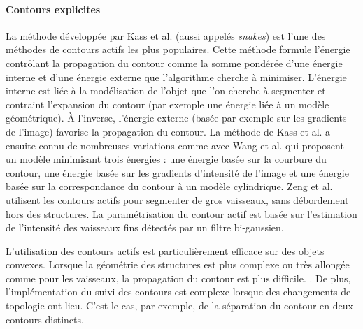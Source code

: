       \paragraph{Contours explicites}
      La méthode développée par Kass et al. \cite{Kass1988_snakes} (aussi appelés \textit{snakes}) est l'une des méthodes de contours actifs les plus populaires. Cette méthode formule l'énergie contrôlant la propagation du contour comme la somme pondérée d'une énergie interne et d'une énergie externe que l'algorithme cherche à minimiser. L'énergie interne est liée à la modélisation de l'objet que l'on cherche à segmenter et contraint l'expansion du contour (par exemple une énergie liée à un modèle géométrique). À l'inverse, l'énergie externe (basée par exemple sur les gradients de l'image) favorise la propagation du contour. La méthode de Kass et al. a ensuite connu de nombreuses variations comme avec Wang et al. \cite{Wang2012_vessel_level_set} qui proposent un modèle minimisant trois énergies : une énergie basée sur la courbure du contour, une énergie basée sur les gradients d'intensité de l'image et une énergie basée sur la correspondance du contour à un modèle cylindrique. Zeng et al. \cite{Zeng2018_liver_hybrid_active_contour_region_growing} utilisent les contours actifs pour segmenter de gros vaisseaux, sans débordement hors des structures. La paramétrisation du contour actif est basée sur l'estimation de l'intensité des vaisseaux fins détectés par un filtre bi-gaussien.

      L'utilisation des contours actifs est particulièrement efficace sur des objets convexes. Lorsque la géométrie des structures est plus complexe ou très allongée comme pour les vaisseaux, la propagation du contour est plus difficile. . De plus, l'implémentation du suivi des contours est complexe lorsque des changements de topologie ont lieu. C'est le cas, par exemple, de la séparation du contour en deux contours distincts.
